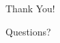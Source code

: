 \documentclass{beamer}
\begin{document}


\begin{frame}{Thank You!}
    \begin{center}
        Questions?
    \end{center}
\end{frame}
\end{document}
